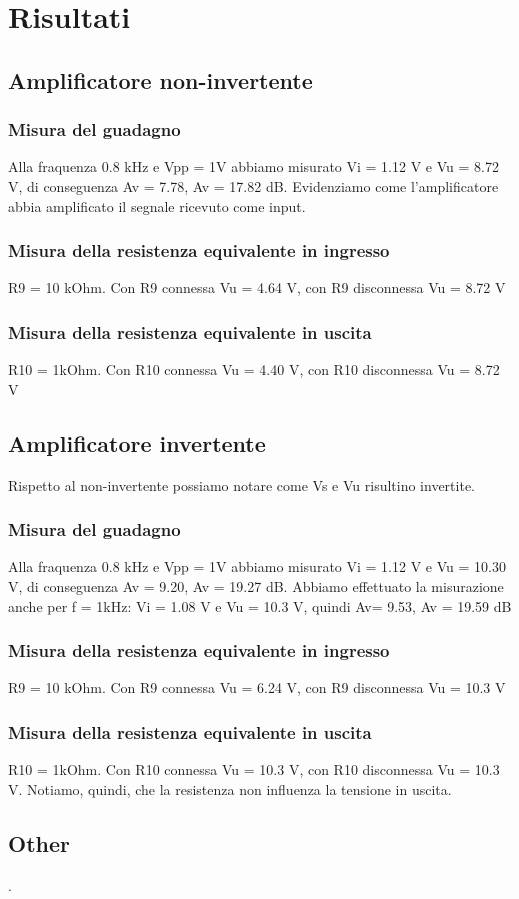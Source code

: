 \documentclass[a4paper]{article}
\begin{document}
	\section{Risultati}
		\subsection{Amplificatore non-invertente}
			\subsubsection{Misura del guadagno}
				Alla fraquenza 0.8 kHz e Vpp = 1V abbiamo misurato Vi = 1.12 V e Vu = 8.72 V, di conseguenza Av = 7.78, Av = 17.82 dB. 
				Evidenziamo come l'amplificatore abbia amplificato il segnale ricevuto come input.
			\subsubsection{Misura della resistenza equivalente in ingresso}	
				R9 = 10 kOhm.
				Con R9 connessa Vu = 4.64 V, con R9 disconnessa Vu = 8.72 V
			\subsubsection{Misura della resistenza equivalente in uscita}
				R10 = 1kOhm.
				Con R10 connessa Vu = 4.40 V, con R10 disconnessa Vu = 8.72 V
		\subsection{Amplificatore invertente}
			Rispetto al non-invertente possiamo notare come Vs e Vu risultino invertite. 
			\subsubsection{Misura del guadagno}
				Alla fraquenza 0.8 kHz e Vpp = 1V abbiamo misurato Vi = 1.12 V e Vu = 10.30 V, di conseguenza Av = 9.20, Av = 19.27 dB. 
				Abbiamo effettuato la misurazione anche per f = 1kHz:
				Vi = 1.08 V e Vu = 10.3 V, quindi Av= 9.53, Av = 19.59 dB
			\subsubsection{Misura della resistenza equivalente in ingresso}	
				R9 = 10 kOhm.
				Con R9 connessa Vu = 6.24 V, con R9 disconnessa Vu = 10.3 V
			\subsubsection{Misura della resistenza equivalente in uscita}	
				R10 = 1kOhm.
				Con R10 connessa Vu = 10.3 V, con R10 disconnessa Vu = 10.3 V.
				Notiamo, quindi, che la resistenza non influenza la tensione in uscita.
		\subsection{Other}
			.
\end{document}
